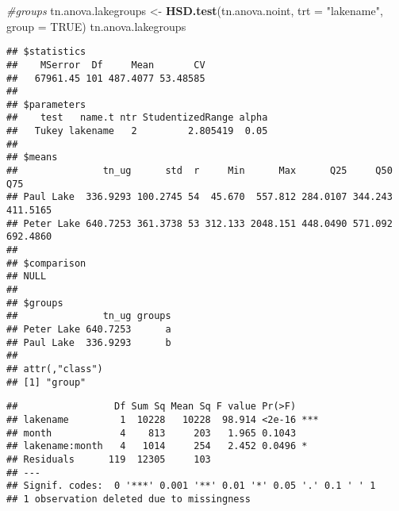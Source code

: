 \documentclass[
]{article}
\newenvironment{Shaded}{\begin{snugshade}}{\end{snugshade}}
\newcommand{\CommentTok}[1]{\textcolor[rgb]{0.56,0.35,0.01}{\textit{#1}}}
\newcommand{\DataTypeTok}[1]{\textcolor[rgb]{0.13,0.29,0.53}{#1}}
\newcommand{\KeywordTok}[1]{\textcolor[rgb]{0.13,0.29,0.53}{\textbf{#1}}}
\newcommand{\NormalTok}[1]{#1}
\newcommand{\OperatorTok}[1]{\textcolor[rgb]{0.81,0.36,0.00}{\textbf{#1}}}
\newcommand{\OtherTok}[1]{\textcolor[rgb]{0.56,0.35,0.01}{#1}}
\newcommand{\StringTok}[1]{\textcolor[rgb]{0.31,0.60,0.02}{#1}}
\begin{document}
\begin{Shaded}
\begin{Highlighting}[]
\CommentTok{#groups}
\NormalTok{tn.anova.lakegroups <-}\StringTok{ }\KeywordTok{HSD.test}\NormalTok{(tn.anova.noint, }\DataTypeTok{trt =} \StringTok{"lakename"}\NormalTok{, }\DataTypeTok{group =} \OtherTok{TRUE}\NormalTok{)}
\NormalTok{tn.anova.lakegroups}
\end{Highlighting}
\end{Shaded}

\begin{verbatim}
## $statistics
##    MSerror  Df     Mean       CV
##   67961.45 101 487.4077 53.48585
## 
## $parameters
##    test   name.t ntr StudentizedRange alpha
##   Tukey lakename   2         2.805419  0.05
## 
## $means
##               tn_ug      std  r     Min      Max      Q25     Q50      Q75
## Paul Lake  336.9293 100.2745 54  45.670  557.812 284.0107 344.243 411.5165
## Peter Lake 640.7253 361.3738 53 312.133 2048.151 448.0490 571.092 692.4860
## 
## $comparison
## NULL
## 
## $groups
##               tn_ug groups
## Peter Lake 640.7253      a
## Paul Lake  336.9293      b
## 
## attr(,"class")
## [1] "group"
\end{verbatim}

\begin{Shaded}
\end{Shaded}

\begin{verbatim}
##                 Df Sum Sq Mean Sq F value Pr(>F)    
## lakename         1  10228   10228  98.914 <2e-16 ***
## month            4    813     203   1.965 0.1043    
## lakename:month   4   1014     254   2.452 0.0496 *  
## Residuals      119  12305     103                   
## ---
## Signif. codes:  0 '***' 0.001 '**' 0.01 '*' 0.05 '.' 0.1 ' ' 1
## 1 observation deleted due to missingness
\end{verbatim}
\end{document}
